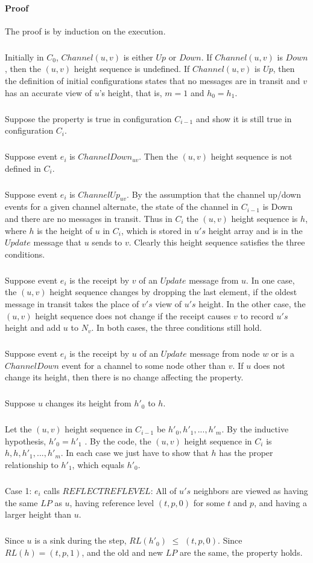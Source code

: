 \paragraph{Proof}The proof is by induction on the execution.
\subparagraph{}Initially in $C_0$, $Channel(u, v)$ is either $Up$ or $Down$. If $Channel(u, v)$ is $Down$, then the $(u, v)$ height sequence is undefined. If $Channel(u, v)$ is $Up$, then the definition of initial configurations states that no messages are in transit and $v$ has an accurate view of $u$'s height, that is, $m = 1$ and $h_0 = h_1$.
\subparagraph{}Suppose the property is true in configuration $C_{i-1}$ and show it is still true in configuration $C_i$.
\subparagraph{}Suppose event $e_i$ is $ChannelDown_{uv}$. Then the $(u, v)$ height sequence is not defined in $C_i$.
\subparagraph{}Suppose event $e_i$ is $ChannelUp_{uv}$. By the assumption that the channel up/down events for a given channel alternate, the state of the channel in $C_{i-1}$ is Down and there are no messages in transit. Thus in $C_i$ the $(u, v)$ height sequence is $h$, where $h$ is the height of $u$ in $C_i$, which is stored in $u's$ height array and is in the $Update$ message that $u$ sends to $v$. Clearly this height sequence satisfies the three conditions.
\subparagraph{}Suppose event $e_i$ is the receipt by $v$ of an $Update$ message from $u$. In one case, the $(u, v)$ height sequence changes by dropping the last element, if the oldest message in transit takes the place of $v's$ view of $u's$ height. In the other case, the $(u, v)$ height sequence does not change if the receipt causes $v$ to record $u's$ height and add $u$ to $N_v$. In both cases, the three conditions still hold.
\subparagraph{}Suppose event $e_i$ is the receipt by $u$ of an $Update$ message from node $w$ or is a $ChannelDown$ event for a channel to some node other than $v$. If $u$ does not change its height, then there is no change affecting the property.
\subparagraph{}Suppose $u$ changes its height from $h' _0$ to $h$.
\subparagraph{}Let the $(u, v)$ height sequence in $C_{i-1}$ be $h' _0 , h'_1, ... , h'_m$. By the inductive hypothesis, $h' _0 = h' _1$ . By the code, the $(u, v)$ height sequence in $C_i$ is $h, h, h'_1 , ... , h'_m$. In each case we just have to show that $h$ has the proper relationship to $h'_1$, which equals $h'_0$.
\subparagraph{}Case 1: $e_i$ calls $REFLECTREFLEVEL$: All of $u's$ neighbors are viewed as having the same $LP$ as $u$, having reference level $(t, p, 0)$ for some $t$ and $p$, and having a larger height than $u$.
\subparagraph{}Since $u$ is a sink during the step, $RL(h'_0 )$ $\leq$ $(t, p, 0)$. Since $RL(h) = (t, p, 1)$, and the old and new $LP$ are the same, the property holds.
